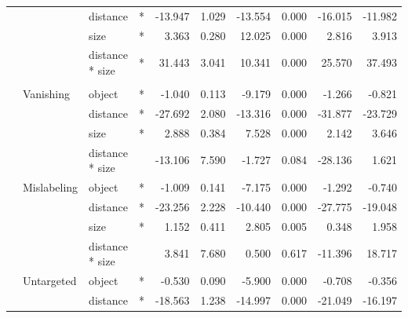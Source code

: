 \begin{longtable}[t]{llllrrrrrr}
\cmidrule{3-10}\nopagebreak
\hspace{1em} &  & distance & * & -13.947 & 1.029 & -13.554 & 0.000 & -16.015 & -11.982\\
\cmidrule{3-10}\nopagebreak
\hspace{1em} &  & size & * & 3.363 & 0.280 & 12.025 & 0.000 & 2.816 & 3.913\\
\cmidrule{3-10}\nopagebreak
\hspace{1em} &  & distance * size & * & 31.443 & 3.041 & 10.341 & 0.000 & 25.570 & 37.493\\
\cmidrule{1-10}\pagebreak[0]
\addlinespace[0.3em]
\multicolumn{10}{l}{\textbf{Faster R-CNN}}\\
\hspace{1em} & Vanishing & object & * & -1.040 & 0.113 & -9.179 & 0.000 & -1.266 & -0.821\\
\cmidrule{3-10}\nopagebreak
\hspace{1em} &  & distance & * & -27.692 & 2.080 & -13.316 & 0.000 & -31.877 & -23.729\\
\cmidrule{3-10}\nopagebreak
\hspace{1em} &  & size & * & 2.888 & 0.384 & 7.528 & 0.000 & 2.142 & 3.646\\
\cmidrule{3-10}\nopagebreak
\hspace{1em} &  & distance * size &  & -13.106 & 7.590 & -1.727 & 0.084 & -28.136 & 1.621\\
\cmidrule{2-10}\nopagebreak
\hspace{1em} & Mislabeling & object & * & -1.009 & 0.141 & -7.175 & 0.000 & -1.292 & -0.740\\
\cmidrule{3-10}\nopagebreak
\hspace{1em} &  & distance & * & -23.256 & 2.228 & -10.440 & 0.000 & -27.775 & -19.048\\
\cmidrule{3-10}\nopagebreak
\hspace{1em} &  & size & * & 1.152 & 0.411 & 2.805 & 0.005 & 0.348 & 1.958\\
\cmidrule{3-10}\nopagebreak
\hspace{1em} &  & distance * size &  & 3.841 & 7.680 & 0.500 & 0.617 & -11.396 & 18.717\\
\cmidrule{2-10}\nopagebreak
\hspace{1em} & Untargeted & object & * & -0.530 & 0.090 & -5.900 & 0.000 & -0.708 & -0.356\\
\cmidrule{3-10}\nopagebreak
\hspace{1em} &  & distance & * & -18.563 & 1.238 & -14.997 & 0.000 & -21.049 & -16.197\\

\end{longtable}

